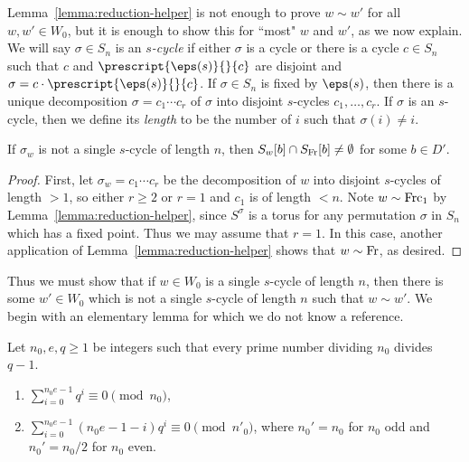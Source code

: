 Lemma~\ref{lemma:reduction-helper} is not enough to prove $w \sim w'$ for all $w, w' \in W_0$, but it is enough to show this for ``most" $w$ and $w'$, as we now explain. We will say $\sigma \in S_n$ is an \textit{$s$-cycle} if either $\sigma$ is a cycle or there is a cycle $c \in S_n$ such that $c$ and $\prescript{\eps(s)}{}{c}$ are disjoint and $\sigma = c \cdot \prescript{\eps(s)}{}{c}$. If $\sigma \in S_n$ is fixed by $\eps(s)$, then there is a unique decomposition $\sigma = c_1 \cdots c_r$ of $\sigma$ into disjoint $s$-cycles $c_1, \dots, c_r$. If $\sigma$ is an $s$-cycle, then we define its \textit{length} to be the number of $i$ such that $\sigma(i) \neq i$.

\begin{lemma}\label{lemma:reduce-to-trivial}
    If $\sigma_w$ is not a single $s$-cycle of length $n$, then $S_w[b] \cap S_{\rm{Fr}}[b] \neq \emptyset$ for some $b \in D'$.
\end{lemma}

\begin{proof}
    First, let $\sigma_w = c_1 \cdots c_r$ be the decomposition of $w$ into disjoint $s$-cycles of length $> 1$, so either $r \geq 2$ or $r=1$ and $c_1$ is of length $< n$. Note $w \sim \rm{Fr}c_1$ by Lemma~\ref{lemma:reduction-helper}, since $S^{\sigma}$ is a torus for any permutation $\sigma$ in $S_n$ which has a fixed point. Thus we may assume that $r = 1$. In this case, another application of Lemma~\ref{lemma:reduction-helper} shows that $w \sim \rm{Fr}$, as desired.
\end{proof}

Thus we must show that if $w \in W_0$ is a single $s$-cycle of length $n$, then there is some $w' \in W_0$ which is not a single $s$-cycle of length $n$ such that $w \sim w'$. We begin with an elementary lemma for which we do not know a reference.

\begin{lemma}\label{lemma:elementary-congruence}
    Let $n_0, e, q \geq 1$ be integers such that every prime number dividing $n_0$ divides $q - 1$.
    \begin{enumerate}
        \item $\sum_{i = 0}^{n_0 e - 1} q^i \equiv 0 \pmod{n_0}$,
        \item $\sum_{i = 0}^{n_0 e - 1} (n_0 e - 1 - i) q^i \equiv 0 \pmod{n'_0}$, where $n_0' = n_0$ for $n_0$ odd and $n_0' = n_0/2$ for $n_0$ even.
    \end{enumerate}
\end{lemma}

